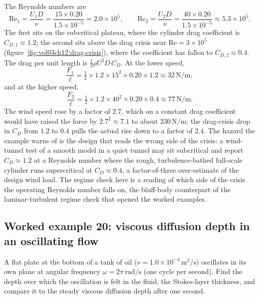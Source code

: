 The Reynolds numbers are
\[
\text{Re}_1 = \frac{U_1 D}{\nu} = \frac{15\times0.20}{1.5\times10^{-5}}
= 2.0\times10^{5}, \qquad
\text{Re}_2 = \frac{U_2 D}{\nu} = \frac{40\times0.20}{1.5\times10^{-5}}
\approx 5.3\times10^{5}.
\]
The first sits on the subcritical plateau, where the cylinder drag
coefficient is $C_{D,1}\approx1.2$; the second sits above the drag
crisis near $\text{Re} = 3\times10^5$
(figure~\ref{fig:vol03ch12:drag-crisis}), where the coefficient has
fallen to $C_{D,2}\approx0.4$. The drag per unit length is $\tfrac12
\rho U^2 D\,C_D$. At the lower speed,
\[
\frac{F_1}{\ell} = \tfrac12\times1.2\times15^2\times0.20\times1.2
\approx 32\,\si{\newton\per\meter},
\]
and at the higher speed,
\[
\frac{F_2}{\ell} = \tfrac12\times1.2\times40^2\times0.20\times0.4
\approx 77\,\si{\newton\per\meter}.
\]
The wind speed rose by a factor of $2.7$, which on a constant drag
coefficient would have raised the force by $2.7^2\approx7.1$ to about
$230\,\si{\newton\per\meter}$; the drag-crisis drop in $C_D$ from
$1.2$ to $0.4$ pulls the actual rise down to a factor of $2.4$. The
hazard the example warns of is the design that reads the wrong side of
the crisis: a wind-tunnel test of a smooth model in a quiet tunnel may
sit subcritical and report $C_D\approx1.2$ at a Reynolds number where
the rough, turbulence-bathed full-scale cylinder runs supercritical at
$C_D\approx0.4$, a factor-of-three over-estimate of the design wind
load. The regime check here is a reading of which side of the crisis
the operating Reynolds number falls on, the bluff-body counterpart of
the laminar-turbulent regime check that opened the worked examples.

\subsection*{Worked example 20: viscous diffusion depth in an oscillating flow}

A flat plate at the bottom of a tank of oil ($\nu = 1.0\times10^{-4}\,
\si{\meter}^2/\si{\second}$) oscillates in its own plane at angular
frequency $\omega = 2\pi\,\si{\radian\per\second}$ (one cycle per
second). Find the depth over which the oscillation is felt in the
fluid, the Stokes-layer thickness, and compare it to the steady viscous
diffusion depth after one second.

